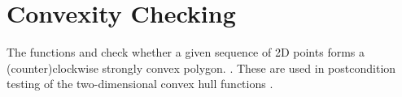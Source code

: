 \section{Convexity Checking}

The functions  and 
check whether a given sequence of 2D points forms a (counter)clockwise strongly
convex polygon.%
.  These are used in postcondition
testing of the two-dimensional convex hull functions%
.

